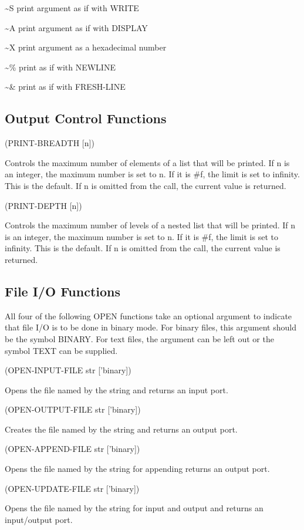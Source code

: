 \documentclass[11pt]{article}
\begin{document}
\textasciitilde{}S print argument as if with WRITE

\textasciitilde{}A print argument as if with DISPLAY

\textasciitilde{}X print argument as a hexadecimal number

\textasciitilde{}\% print as if with NEWLINE

\textasciitilde{}\& print as if with FRESH-LINE
\subsection{Output Control Functions}
\label{sec-1-38}

(PRINT-BREADTH [n])

Controls the maximum number of elements of a list that will be
printed. If n is an integer, the maximum number is set to n. If it
is \#f, the limit is set to infinity. This is the default. If n is
omitted from the call, the current value is returned.

(PRINT-DEPTH [n])

Controls the maximum number of levels of a nested list that will be
printed. If n is an integer, the maximum number is set to n. If it
is \#f, the limit is set to infinity. This is the default. If n is
omitted from the call, the current value is returned.
\subsection{File I/O Functions}
\label{sec-1-39}

All four of the following OPEN functions take an optional argument to
indicate that file I/O is to be done in binary mode. For binary files,
this argument should be the symbol BINARY. For text files, the argument
can be left out or the symbol TEXT can be supplied.

(OPEN-INPUT-FILE str ['binary])

Opens the file named by the string and returns an input port.

(OPEN-OUTPUT-FILE str ['binary])

Creates the file named by the string and returns an output port.

(OPEN-APPEND-FILE str ['binary])

Opens the file named by the string for appending returns an output port.

(OPEN-UPDATE-FILE str ['binary])

Opens the file named by the string for input and output and returns an
input/output port.
\end{document}
